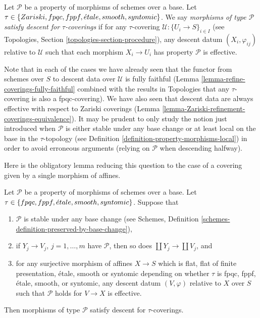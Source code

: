 \begin{definition}
\label{definition-descending-types-morphisms}
Let $\mathcal{P}$ be a property of morphisms of schemes over a base.
Let $\tau \in \{Zariski, fpqc, fppf, {\acute{e}tale}, smooth, syntomic\}$.
We say
{\it morphisms of type $\mathcal{P}$ satisfy descent for $\tau$-coverings}
if for
any $\tau$-covering $\mathcal{U} : \{U_i \to S\}_{i \in I}$
(see Topologies, Section \ref{topologies-section-procedure}),
any descent datum $(X_i, \varphi_{ij})$ relative to $\mathcal{U}$
such that each morphism $X_i \to U_i$ has property $\mathcal{P}$
is effective.
\end{definition}

\noindent
Note that in each of the cases we have already seen that
the functor from schemes over $S$ to descent data over
$\mathcal{U}$ is fully faithful
(Lemma \ref{lemma-refine-coverings-fully-faithful} combined
with the results in Topologies that any $\tau$-covering
is also a fpqc-covering).
We have also seen that descent data are always effective with
respect to Zariski coverings
(Lemma \ref{lemma-Zariski-refinement-coverings-equivalence}).
It may be prudent to only study the notion just introduced
when $\mathcal{P}$ is either stable under any base change or at least
local on the base in the $\tau$-topology
(see Definition \ref{definition-property-morphisms-local})
in order to avoid erroneous arguments (relying on $\mathcal{P}$
when descending halfway).

\medskip\noindent
Here is the obligatory lemma reducing this question
to the case of a covering given by a single morphism of affines.

\begin{lemma}
\label{lemma-descending-types-morphisms}
Let $\mathcal{P}$ be a property of morphisms of schemes over a base.
Let $\tau \in \{fpqc, fppf, {\acute{e}tale}, smooth, syntomic\}$.
Suppose that
\begin{enumerate}
\item $\mathcal{P}$ is stable under any base change
(see Schemes, Definition \ref{schemes-definition-preserved-by-base-change}),
\item if $Y_j \to V_j$, $j = 1, \ldots, m$ have $\mathcal{P}$,
then so does $\coprod Y_j \to \coprod V_j$, and
\item for any surjective morphism of affines
$X \to S$ which is flat, flat of finite presentation,
\'etale, smooth or syntomic depending on whether $\tau$ is
fpqc, fppf, \'etale, smooth, or syntomic,
any descent datum $(V, \varphi)$ relative
to $X$ over $S$ such that $\mathcal{P}$ holds for
$V \to X$ is effective.
\end{enumerate}
Then morphisms of type $\mathcal{P}$ satisfy descent for $\tau$-coverings.
\end{lemma}

